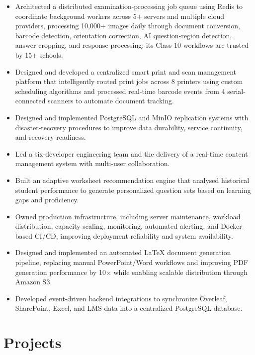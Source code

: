 \documentclass[11pt,a4paper]{article}
\begin{document}
\begin{itemize}
    \item Architected a distributed examination-processing job queue using Redis to coordinate background workers across 5+ servers and multiple cloud providers, processing 10,000+ images daily through document conversion, barcode detection, orientation correction, AI question-region detection, answer cropping, and response processing; its Class 10 workflows are trusted by 15+ schools.
    \item Designed and developed a centralized smart print and scan management platform that intelligently routed print jobs across 8 printers using custom scheduling algorithms and processed real-time barcode events from 4 serial-connected scanners to automate document tracking.
    \item Designed and implemented PostgreSQL and MinIO replication systems with disaster-recovery procedures to improve data durability, service continuity, and recovery readiness.
    \item Led a six-developer engineering team and the delivery of a real-time content management system with multi-user collaboration.
    \item Built an adaptive worksheet recommendation engine that analysed historical student performance to generate personalized question sets based on learning gaps and proficiency.
    \item Owned production infrastructure, including server maintenance, workload distribution, capacity scaling, monitoring, automated alerting, and Docker-based CI/CD, improving deployment reliability and system availability.
    \item Designed and implemented an automated LaTeX document generation pipeline, replacing manual PowerPoint/Word workflows and improving PDF generation performance by 10\(\times\) while enabling scalable distribution through Amazon S3.
    \item Developed event-driven backend integrations to synchronize Overleaf, SharePoint, Excel, and LMS data into a centralized PostgreSQL database.
\end{itemize}

\section{\Large{Projects}}
\end{document}
